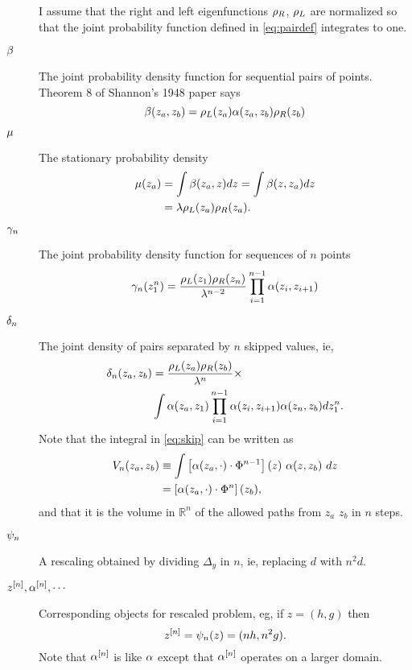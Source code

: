 \documentclass[twocolumn]{article}
\newcommand{\field}[1]{\mathbb{#1}}
\newcommand\REAL{\field{R}}
\begin{document}
\begin{description}
  I assume that the right and left eigenfunctions $\rho_R$, $\rho_L$
  are normalized so that the joint probability function defined in
  \eqref{eq:pairdef} integrates to one.
\item[$\beta$] The joint probability density function for sequential
  pairs of points.  Theorem 8 of Shannon's 1948 paper says
  \begin{equation}
    \label{eq:pairdef}
    \beta(z_a,z_b) = \rho_L(z_a) \alpha(z_a,z_b) \rho_R(z_b)
  \end{equation}
\item[$\mu$] The stationary probability density
  \begin{align}
    \mu(z_a) &= \int \beta(z_a,z) dz = \int \beta(z,z_a) dz
                       \nonumber \\
    \label{eq:stationary}
                     &= \lambda \rho_L(z_a) \rho_R(z_a).
  \end{align}
\item[$\gamma_{n}$] The joint probability density function for
  sequences of $n$ points
  \begin{equation}
    \label{eq:ptuple}
    \gamma_{n}(z_{1}^{n}) = \frac{\rho_L(z_1)
      \rho_R(z_n)}{\lambda^{n-2}} \prod_{i=1}^{n-1} \alpha(z_i,z_{i+1})
  \end{equation}
\item[$\delta_{n}$] The joint density of pairs separated by $n$ skipped
  values, ie,
  \begin{align}
    \delta_{n}(z_a,z_b) &= \frac{\rho_L(z_a) \rho_R(z_b)}{\lambda^n}
                        \times \nonumber \\
    \label{eq:skip}
                      & \int \alpha(z_a,z_1) \prod_{i=1}^{n-1}
                        \alpha(z_i,z_{i+1}) \alpha(z_n,z_b) d
                        z_{1}^{n}.
  \end{align}
  Note that the integral in \eqref{eq:skip} can be written as
  \begin{align}
    V_n(z_a,z_b) &\equiv \int \left[ \alpha(z_a,\cdot) \cdot
      \Phi^{n-1} \right] (z)~ \alpha(z,z_b)~ dz \nonumber \\
    \label{eq:volume}
    &= \left[ \alpha(z_a,\cdot) \cdot \Phi^{n} \right] (z_b),
  \end{align}
  and that it is the volume in $\REAL^n$ of the allowed paths from
  $z_a$ $z_b$ in $n$ steps.
\item[$\psi_{n}$] A rescaling obtained by dividing $\Delta_y$ in $n$,
  ie, replacing $d$ with $n^2d$.
\item[$z^{[n]}, \alpha^{[n]},\cdots $] Corresponding objects for
  rescaled problem, eg, if $z=(h,g)$ then
  \begin{equation*}
    z^{[n]} = \psi_{n}(z) = (nh, n^2g).
  \end{equation*}
  Note that $\alpha^{[n]}$ is like $\alpha$ except that
  $\alpha^{[n]}$ operates on a larger domain.
\end{description}
\end{document}

